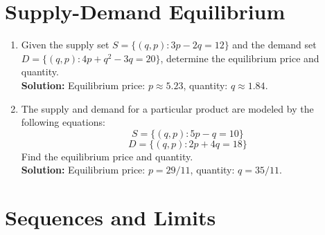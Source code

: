 \documentclass{article}
\begin{document}
\section{Supply-Demand Equilibrium}

\begin{enumerate}[leftmargin = 0.5cm, label = \arabic*., rightmargin = 0.2cm]

    \item Given the supply set $S = \{(q,p) : 3p - 2q = 12\}$ and the demand set $D = \{(q,p) : 4p + q^2 - 3q = 20\}$, determine the equilibrium price and quantity. \\
    \textbf{Solution:} Equilibrium price: \( p \approx 5.23 \), quantity: \( q \approx  1.84 \).

    \item The supply and demand for a particular product are modeled by the following equations: 
    \[
    S = \{(q,p) : 5p - q = 10\}
    \]
    \[
    D = \{(q,p) : 2p + 4q = 18\}
    \]
    Find the equilibrium price and quantity. \\
    \textbf{Solution:} Equilibrium price: \( p = 29/11 \), quantity: \( q = 35/11 \).

\end{enumerate}

\section{Sequences and Limits}
\end{document}
